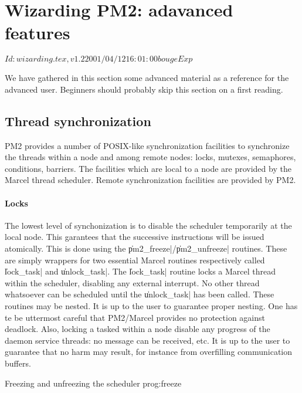 \section{Wizarding PM2: adavanced features}

\stamp $Id: wizarding.tex,v 1.2 2001/04/12 16:01:00 bouge Exp $

We have gathered in this section some advanced material as a reference
for the advanced user. Beginners should probably skip this section on
a first reading. 

\subsection{Thread synchronization}

PM2 provides a number of POSIX-like synchronization facilities to
synchronize the threads within a node and among remote nodes: locks,
mutexes, semaphores, conditions, barriers. The facilities which are
local to a node are provided by the Marcel thread scheduler. Remote
synchronization facilities are provided by PM2.

\paragraph{Locks}

The lowest level of synchonization is to disable the scheduler
temporarily at the local node. This garantees that the successive
instructions will be issued atomically. This is done using the
\|pm2_freeze|/\|pm2_unfreeze| routines. These are simply wrappers for
two essential Marcel routines respectively called \|lock_task| and
\|unlock_task|. The \|lock_task| routine locks a Marcel thread within
the scheduler, disabling any external interrupt. No other thread
whatsoever can be scheduled until the \|unlock_task| has been called.
These routines may be nested. It is up to the user to guarantee proper
nesting. One has te be uttermost careful that PM2/Marcel provides no
protection against deadlock. Also, locking a tasked within a node
disable any progress of the daemon service threads: no message can be
received, etc. It is up to the user to guarantee that no harm may
result, for instance from overfilling communication buffers.

 {Freezing and unfreezing the scheduler}
{prog:freeze}

